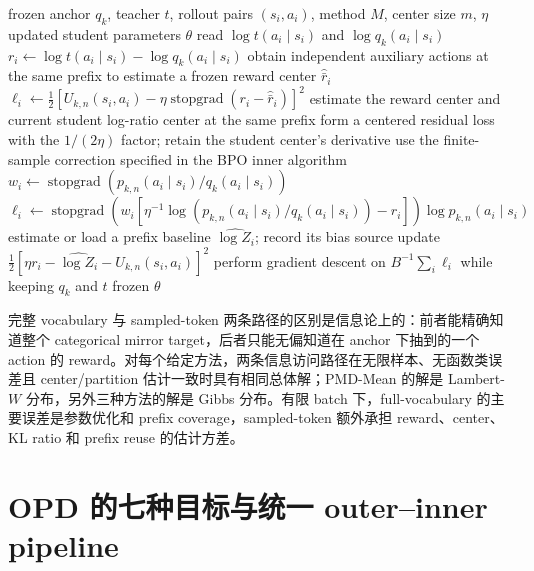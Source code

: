 \documentclass[lang=cn,scheme=chinese,openany]{../book/elegantbook}
\newcommand{\sg}{\operatorname{stopgrad}}
\begin{document}
\begin{algorithm}[ht]
\caption{OPD sampled-token inner update\\{\small\textit{Semantics: 每个 prefix 只访问 rollout 的下一个 token}}}
\begin{algorithmic}[1]
\Require frozen anchor $q_k$, teacher $t$, rollout pairs $(s_i,a_i)$, method $M$, center size $m$, $\eta$
\Ensure updated student parameters $\theta$
    \State read $\log t(a_i\mid s_i)$ and $\log q_k(a_i\mid s_i)$
    \State $r_i\gets\log t(a_i\mid s_i)-\log q_k(a_i\mid s_i)$
        \State obtain independent auxiliary actions at the same prefix to estimate a frozen reward center $\widehat{\bar r}_i$
        \State $\ell_i\gets\frac12[U_{k,n}(s_i,a_i)-\eta\sg(r_i-\widehat{\bar r}_i)]^2$
        \State estimate the reward center and current student log-ratio center at the same prefix
        \State form a centered residual loss with the $1/(2\eta)$ factor; retain the student center's derivative
        \State use the finite-sample correction specified in the BPO inner algorithm
        \State $w_i\gets\sg\!\left(p_{k,n}(a_i\mid s_i)/q_k(a_i\mid s_i)\right)$
        \State $\ell_i\gets\sg\!\left(w_i[\eta^{-1}\log(p_{k,n}(a_i\mid s_i)/q_k(a_i\mid s_i))-r_i]\right)\log p_{k,n}(a_i\mid s_i)$
        \State estimate or load a prefix baseline $\widehat{\log Z_i}$; record its bias source
        \State update $\frac12[\eta r_i-\widehat{\log Z_i}-U_{k,n}(s_i,a_i)]^2$
    \EndIf
\EndFor
\State perform gradient descent on $B^{-1}\sum_i\ell_i$ while keeping $q_k$ and $t$ frozen
\State \Return $\theta$
\end{algorithmic}
\end{algorithm}

完整 vocabulary 与 sampled-token 两条路径的区别是信息论上的：前者能精确知道整个 categorical mirror target，后者只能无偏知道在 anchor 下抽到的一个 action 的 reward。对每个给定方法，两条信息访问路径在无限样本、无函数类误差且 center/partition 估计一致时具有相同总体解；PMD-Mean 的解是 Lambert-$W$ 分布，另外三种方法的解是 Gibbs 分布。有限 batch 下，full-vocabulary 的主要误差是参数优化和 prefix coverage，sampled-token 额外承担 reward、center、KL ratio 和 prefix reuse 的估计方差。



\section{OPD 的七种目标与统一 outer--inner pipeline}
\label{sec:ch2-opd-baselines}
\end{document}
